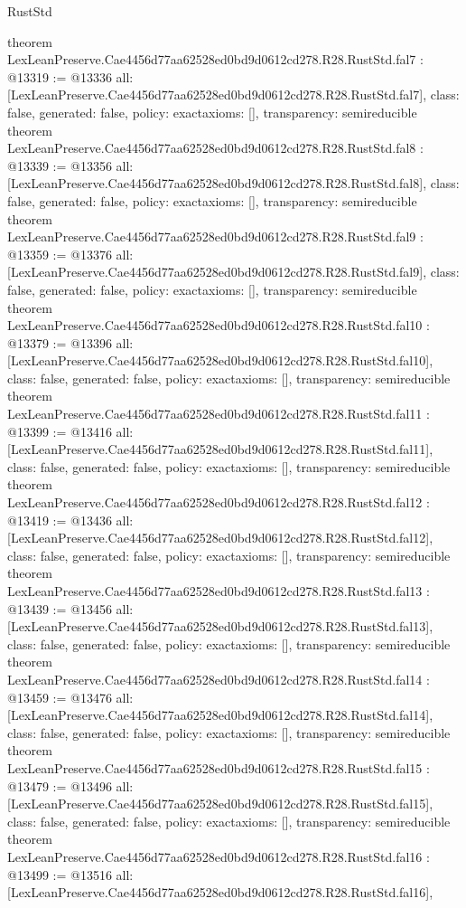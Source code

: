 \begin{lexlean}{RustStd}
\begin{coremodule}
{}
theorem LexLeanPreserve.Cae4456d77aa62528ed0bd9d0612cd278.R28.RustStd.fal7 : @13319 := @13336 {
  all: [LexLeanPreserve.Cae4456d77aa62528ed0bd9d0612cd278.R28.RustStd.fal7],
  class: false,
  generated: false,
  policy: exact{axioms: []},
  transparency: semireducible
}
theorem LexLeanPreserve.Cae4456d77aa62528ed0bd9d0612cd278.R28.RustStd.fal8 : @13339 := @13356 {
  all: [LexLeanPreserve.Cae4456d77aa62528ed0bd9d0612cd278.R28.RustStd.fal8],
  class: false,
  generated: false,
  policy: exact{axioms: []},
  transparency: semireducible
}
theorem LexLeanPreserve.Cae4456d77aa62528ed0bd9d0612cd278.R28.RustStd.fal9 : @13359 := @13376 {
  all: [LexLeanPreserve.Cae4456d77aa62528ed0bd9d0612cd278.R28.RustStd.fal9],
  class: false,
  generated: false,
  policy: exact{axioms: []},
  transparency: semireducible
}
theorem LexLeanPreserve.Cae4456d77aa62528ed0bd9d0612cd278.R28.RustStd.fal10 : @13379 := @13396 {
  all: [LexLeanPreserve.Cae4456d77aa62528ed0bd9d0612cd278.R28.RustStd.fal10],
  class: false,
  generated: false,
  policy: exact{axioms: []},
  transparency: semireducible
}
theorem LexLeanPreserve.Cae4456d77aa62528ed0bd9d0612cd278.R28.RustStd.fal11 : @13399 := @13416 {
  all: [LexLeanPreserve.Cae4456d77aa62528ed0bd9d0612cd278.R28.RustStd.fal11],
  class: false,
  generated: false,
  policy: exact{axioms: []},
  transparency: semireducible
}
theorem LexLeanPreserve.Cae4456d77aa62528ed0bd9d0612cd278.R28.RustStd.fal12 : @13419 := @13436 {
  all: [LexLeanPreserve.Cae4456d77aa62528ed0bd9d0612cd278.R28.RustStd.fal12],
  class: false,
  generated: false,
  policy: exact{axioms: []},
  transparency: semireducible
}
theorem LexLeanPreserve.Cae4456d77aa62528ed0bd9d0612cd278.R28.RustStd.fal13 : @13439 := @13456 {
  all: [LexLeanPreserve.Cae4456d77aa62528ed0bd9d0612cd278.R28.RustStd.fal13],
  class: false,
  generated: false,
  policy: exact{axioms: []},
  transparency: semireducible
}
theorem LexLeanPreserve.Cae4456d77aa62528ed0bd9d0612cd278.R28.RustStd.fal14 : @13459 := @13476 {
  all: [LexLeanPreserve.Cae4456d77aa62528ed0bd9d0612cd278.R28.RustStd.fal14],
  class: false,
  generated: false,
  policy: exact{axioms: []},
  transparency: semireducible
}
theorem LexLeanPreserve.Cae4456d77aa62528ed0bd9d0612cd278.R28.RustStd.fal15 : @13479 := @13496 {
  all: [LexLeanPreserve.Cae4456d77aa62528ed0bd9d0612cd278.R28.RustStd.fal15],
  class: false,
  generated: false,
  policy: exact{axioms: []},
  transparency: semireducible
}
theorem LexLeanPreserve.Cae4456d77aa62528ed0bd9d0612cd278.R28.RustStd.fal16 : @13499 := @13516 {
  all: [LexLeanPreserve.Cae4456d77aa62528ed0bd9d0612cd278.R28.RustStd.fal16],
}
\end{coremodule}
\end{lexlean}
